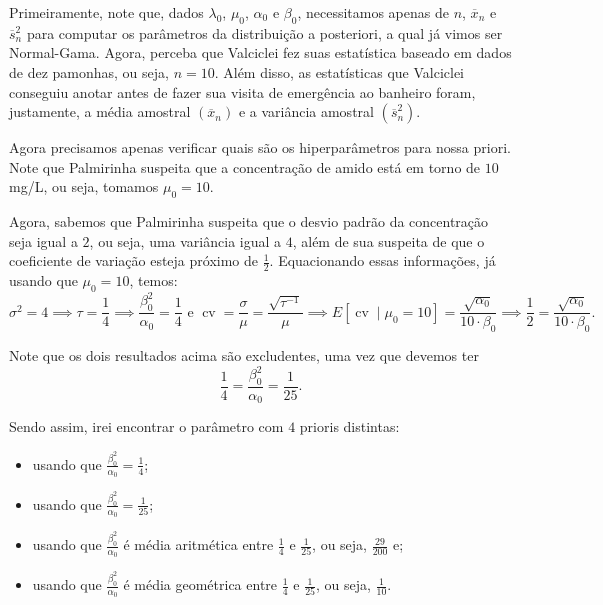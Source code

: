 \documentclass{article}
\begin{document}
Primeiramente, note que, dados $\lambda_0$, $\mu_0$, $\alpha_0$ e $\beta_0$, necessitamos apenas de $n$, $\overline{x}_n$ e $\overline{s}_n^2$ para computar os parâmetros da distribuição a posteriori, a qual já vimos ser Normal-Gama. Agora, perceba que Valciclei fez suas estatística baseado em dados de dez pamonhas, ou seja, $n = 10$. Além disso, as estatísticas que Valciclei conseguiu anotar antes de fazer sua visita de emergência ao banheiro foram, justamente, a média amostral $\left(\overline{x}_n\right)$ e a variância amostral $\left(\overline{s}_n^2\right)$.

Agora precisamos apenas verificar quais são os hiperparâmetros para nossa priori. Note que Palmirinha suspeita que a concentração de amido está em torno de $10$ mg/L, ou seja, tomamos $\mu_0 = 10$.

Agora, sabemos que Palmirinha suspeita que o desvio padrão da concentração seja igual a $2$, ou seja, uma variância igual a $4$, além de sua suspeita de que o coeficiente de variação esteja próximo de $\frac{1}{2}$. Equacionando essas informações, já usando que $\mu_0 = 10$, temos:
\[\sigma^2 = 4 \implies \tau = \dfrac{1}{4} \implies \dfrac{\beta_0^2}{\alpha_0} = \dfrac{1}{4} \text{ e } \operatorname{cv} = \dfrac{\sigma}{\mu} = \dfrac{\sqrt{\tau^{-1}}}{\mu} \implies E\left[\operatorname{cv} \mid \mu_0 = 10\right] = \dfrac{\sqrt{\alpha_0}}{10\cdot \beta_0} \implies \dfrac{1}{2} = \dfrac{\sqrt{\alpha_0}}{10\cdot \beta_0}.\]

Note que os dois resultados acima são excludentes, uma vez que devemos ter
\[\dfrac{1}{4} = \dfrac{\beta_0^2}{\alpha_0} = \dfrac{1}{25}.\]

Sendo assim, irei encontrar o parâmetro com $4$ prioris distintas:
\begin{itemize}
    \item
        usando que $\frac{\beta_0^2}{\alpha_0} = \frac{1}{4}$;
        
    \item
        usando que $\frac{\beta_0^2}{\alpha_0} = \frac{1}{25}$;
        
    \item
        usando que $\frac{\beta_0^2}{\alpha_0}$ é média aritmética entre $\frac{1}{4}$ e $\frac{1}{25}$, ou seja, $\frac{29}{200}$ e;
        
    \item
        usando que $\frac{\beta_0^2}{\alpha_0}$ é média geométrica entre $\frac{1}{4}$ e $\frac{1}{25}$, ou seja, $\frac{1}{10}$.
\end{itemize}
\end{document}
